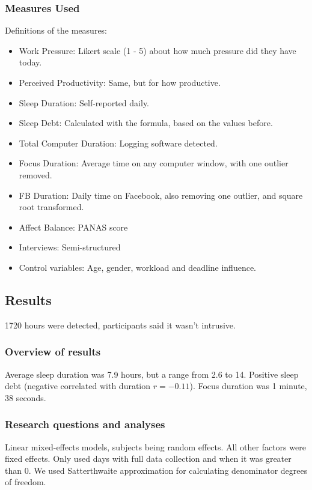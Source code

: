 \documentclass{IEEEtran}
\begin{document}
      \subsubsection{Measures Used}
        Definitions of the measures:
        \begin{itemize}
          \item Work Pressure: Likert scale (1 - 5) about how much pressure did they have today.
          \item Perceived Productivity: Same, but for how productive.
          \item Sleep Duration: Self-reported daily.
          \item Sleep Debt: Calculated with the formula, based on the values before.
          \item Total Computer Duration: Logging software detected.
          \item Focus Duration: Average time on any computer window, with one outlier removed.
          \item FB Duration: Daily time on Facebook, also removing one outlier, and square root transformed.
          \item Affect Balance: PANAS score 
          \item Interviews: Semi-structured
          \item Control variables: Age, gender, workload and deadline influence.
        \end{itemize}
    \subsection{Results}
      1720 hours were detected, participants said it wasn't intrusive.
      \subsubsection{Overview of results}
        Average sleep duration was 7.9 hours, but a range from 2.6 to 14. Positive sleep debt (negative correlated with duration $r=-0.11$). Focus duration was 1 minute, 38 seconds.
      \subsubsection{Research questions and analyses}
        Linear mixed-effects models, subjects being random effects. All other factors were fixed effects. Only used days with full data collection and when it was greater than 0. We used Satterthwaite approximation for calculating denominator degrees of freedom. 
\end{document}

